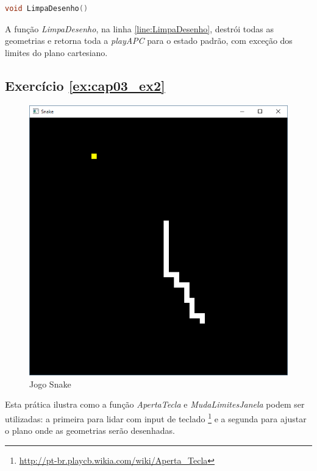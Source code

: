 \begin{lstlisting}[label={func:LimpaDesenho},language=C++]
void LimpaDesenho() 
\end{lstlisting}
A função \emph{LimpaDesenho}, na linha \ref{line:LimpaDesenho}, destrói todas as geometrias e retorna toda a \emph{playAPC} para o estado padrão, com exceção dos limites do plano cartesiano.

\subsection*{Exercício \ref{ex:cap03_ex2} }
\begin{figure}[ht]
  \centerline{\includegraphics[width=.5\textwidth]{img/cap3_ex10.png}}
  \caption{Jogo Snake}
  \label{fig:cap03_ex2}
\end{figure}
Esta prática ilustra como a função \emph{ApertaTecla} e \emph{MudaLimitesJanela} podem ser utilizadas: a primeira para lidar com input de teclado \footnote{\url{http://pt-br.playcb.wikia.com/wiki/Aperta_Tecla}} e a segunda para ajustar o plano onde as geometrias serão desenhadas.

